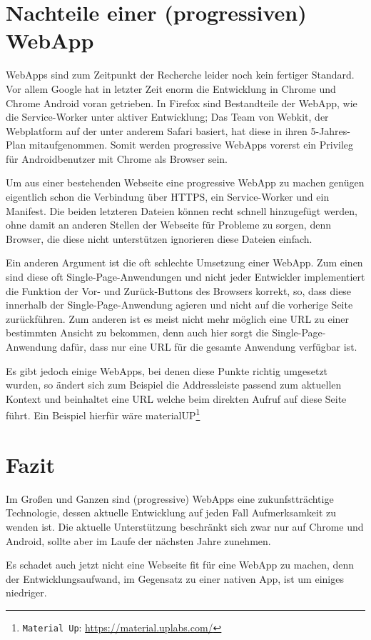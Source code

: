 \documentclass[a4paper,12pt,ngerman,listof=numbered]{scrartcl}      %
\let\oldcite\cite
\renewcommand{\cite}[1]{\textsuperscript{\oldcite{#1}}}
\providecommand{\inlinecode}[1]{\texttt{#1}}
\begin{document}
	\section{Nachteile einer (progressiven) WebApp}
	WebApps sind zum Zeitpunkt der Recherche leider noch kein fertiger Standard. Vor allem Google hat in letzter Zeit enorm die Entwicklung in Chrome und Chrome Android voran getrieben. In Firefox sind Bestandteile der WebApp, wie die Service-Worker unter aktiver Entwicklung; Das Team von Webkit, der Webplatform auf der unter anderem Safari basiert, hat diese in ihren 5-Jahres-Plan mitaufgenommen. Somit werden progressive WebApps vorerst ein Privileg für Androidbenutzer mit Chrome als Browser sein.\cite{telerikWebApp}\par
	Um aus einer bestehenden Webseite eine progressive WebApp zu machen genügen eigentlich schon die Verbindung über HTTPS, ein Service-Worker und ein Manifest. Die beiden letzteren Dateien können recht schnell hinzugefügt werden, ohne damit an anderen Stellen der Webseite für Probleme zu sorgen, denn Browser, die diese nicht unterstützen ignorieren diese Dateien einfach.\par
	Ein anderen Argument ist die oft schlechte Umsetzung einer WebApp. Zum einen sind diese oft Single-Page-Anwendungen und nicht jeder Entwickler implementiert die Funktion der Vor- und Zurück-Buttons des Browsers korrekt, so, dass diese innerhalb der Single-Page-Anwendung agieren und nicht auf die vorherige Seite zurückführen. Zum anderen ist es meist nicht mehr möglich eine URL zu einer bestimmten Ansicht zu bekommen, denn auch hier sorgt die Single-Page-Anwendung dafür, dass nur eine URL für die gesamte Anwendung verfügbar ist.\par
	Es gibt jedoch einige WebApps, bei denen diese Punkte richtig umgesetzt wurden, so ändert sich zum Beispiel die Addressleiste passend zum aktuellen Kontext und beinhaltet eine URL welche beim direkten Aufruf auf diese Seite führt. Ein Beispiel hierfür wäre materialUP\footnote{\inlinecode{Material Up}: \url{https://material.uplabs.com/}}
	\section{Fazit}
	Im Großen und Ganzen sind (progressive) WebApps eine zukunfstträchtige Technologie, dessen aktuelle Entwicklung auf jeden Fall Aufmerksamkeit zu wenden ist. Die aktuelle Unterstützung beschränkt sich zwar nur auf Chrome und Android, sollte aber im Laufe der nächsten Jahre zunehmen.\par
	Es schadet auch jetzt nicht eine Webseite fit für eine WebApp zu machen, denn der Entwicklungsaufwand, im Gegensatz zu einer nativen App, ist um einiges niedriger.
	\newpage
\end{document}

